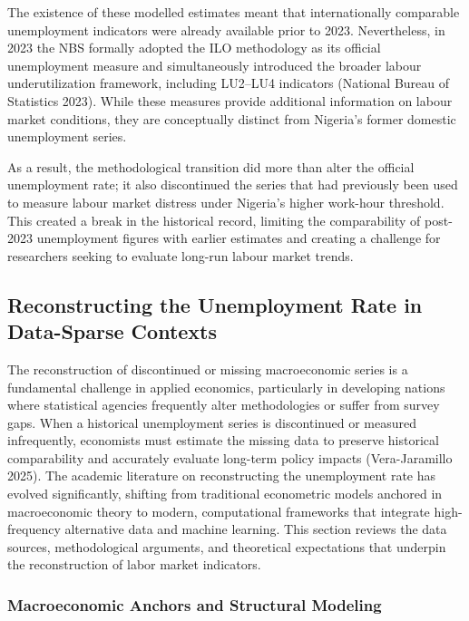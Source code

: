 \documentclass[
  letterpaper,
  DIV=11,
  numbers=noendperiod]{scrartcl}
\begin{document}
The existence of these modelled estimates meant that internationally
comparable unemployment indicators were already available prior to 2023.
Nevertheless, in 2023 the NBS formally adopted the ILO methodology as
its official unemployment measure and simultaneously introduced the
broader labour underutilization framework, including LU2--LU4 indicators
(National Bureau of Statistics 2023). While these measures provide
additional information on labour market conditions, they are
conceptually distinct from Nigeria's former domestic unemployment
series.

As a result, the methodological transition did more than alter the
official unemployment rate; it also discontinued the series that had
previously been used to measure labour market distress under Nigeria's
higher work-hour threshold. This created a break in the historical
record, limiting the comparability of post-2023 unemployment figures
with earlier estimates and creating a challenge for researchers seeking
to evaluate long-run labour market trends.

\subsection{Reconstructing the Unemployment Rate in Data-Sparse
Contexts}\label{reconstructing-the-unemployment-rate-in-data-sparse-contexts}

The reconstruction of discontinued or missing macroeconomic series is a
fundamental challenge in applied economics, particularly in developing
nations where statistical agencies frequently alter methodologies or
suffer from survey gaps. When a historical unemployment series is
discontinued or measured infrequently, economists must estimate the
missing data to preserve historical comparability and accurately
evaluate long-term policy impacts (Vera-Jaramillo 2025). The academic
literature on reconstructing the unemployment rate has evolved
significantly, shifting from traditional econometric models anchored in
macroeconomic theory to modern, computational frameworks that integrate
high-frequency alternative data and machine learning. This section
reviews the data sources, methodological arguments, and theoretical
expectations that underpin the reconstruction of labor market
indicators.

\subsubsection{Macroeconomic Anchors and Structural
Modeling}\label{macroeconomic-anchors-and-structural-modeling}
\end{document}
